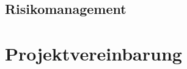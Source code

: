 \documentclass{fhnwreport/fhnwreport}
\begin{document}
\clearpage
\begin{landscape}
\section{Risikomanagement}
\label{sec:risikomanagement}

\end{landscape}


%

\clearpage
\section*{Projektvereinbarung}
\label{sec:projektvereinbarung}




\end{document}
